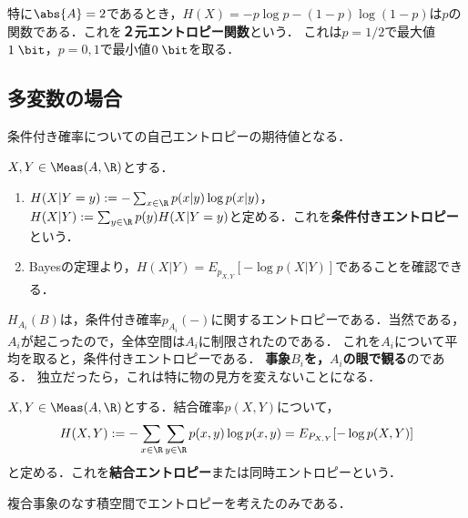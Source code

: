 \documentclass[uplatex,dvipdfmx]{jsreport}
\begin{document}
\begin{example}
    特に$\abs{A}=2$であるとき，$H(X)=-p\log p-(1-p)\log(1-p)$は$p$の関数である．これを\textbf{２元エントロピー関数}という．
    これは$p=1/2$で最大値$1\;\bit$，$p=0,1$で最小値$0\;\bit$を取る．
\end{example}

\subsection{多変数の場合}

\begin{tcolorbox}[colframe=ForestGreen, colback=ForestGreen!10!white,breakable,colbacktitle=ForestGreen!40!white,coltitle=black,fonttitle=\bfseries\sffamily,
title=]
    条件付き確率についての自己エントロピーの期待値となる．
\end{tcolorbox}

\begin{definition}
    $X,Y\in\Meas(A,\R)$とする．
    \begin{enumerate}
        \item $H(X|Y=y):=-\sum_{x\in\R}p(x|y)\log p(x|y)$，$H(X|Y):=\sum_{y\in\R}p(y)H(X|Y=y)$と定める．これを\textbf{条件付きエントロピー}という．
        \item Bayesの定理より，$H(X|Y)=E_{p_{X,Y}}[-\log p(X|Y)]$であることを確認できる．
    \end{enumerate}
\end{definition}
\begin{remarks}
    $H_{A_i}(B)$は，条件付き確率$p_{A_i}(-)$に関するエントロピーである．当然である，$A_i$が起こったので，全体空間は$A_i$に制限されたのである．
    これを$A_i$について平均を取ると，条件付きエントロピーである．
    \textbf{事象$B_i$を，$A_i$の眼で観る}のである．
    独立だったら，これは特に物の見方を変えないことになる．
\end{remarks}

\begin{definition}
    $X,Y\in\Meas(A,\R)$とする．結合確率$p(X,Y)$について，
    \[H(X,Y):=-\sum_{x\in\R}\sum_{y\in\R}p(x,y)\log p(x,y)=E_{P_{X,Y}}[-\log p(X,Y)]\]
    と定める．これを\textbf{結合エントロピー}または同時エントロピーという．
\end{definition}
\begin{remarks}
    複合事象のなす積空間でエントロピーを考えたのみである．
\end{remarks}
\end{document}
